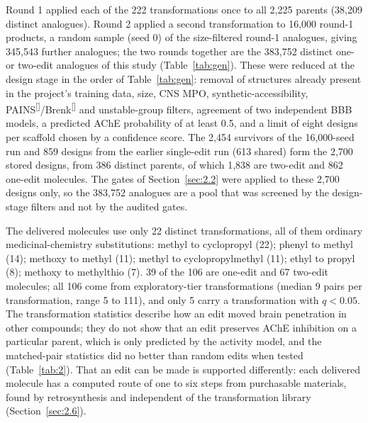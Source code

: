 \documentclass[11pt,a4paper]{article}
\renewcommand{\cite}[1]{\textsuperscript{[\citenum{#1}]}}
\begin{document}
Round 1 applied each of the 222 transformations once to all 2,225 parents (38,209 distinct analogues). Round 2 applied a second transformation to 16,000 round-1 products, a random sample (seed 0) of the size-filtered round-1 analogues, giving 345,543 further analogues; the two rounds together are the 383,752 distinct one- or two-edit analogues of this study (Table~\ref{tab:gen}). These were reduced at the design stage in the order of Table~\ref{tab:gen}: removal of structures already present in the project's training data, size, CNS MPO, synthetic-accessibility, PAINS\cite{pains}/Brenk\cite{brenk} and unstable-group filters, agreement of two independent BBB models, a predicted AChE probability of at least 0.5, and a limit of eight designs per scaffold chosen by a confidence score. The 2,454 survivors of the 16,000-seed run and 859 designs from the earlier single-edit run (613 shared) form the 2,700 stored designs, from 386 distinct parents, of which 1,838 are two-edit and 862 one-edit molecules. The gates of Section~\ref{sec:2.2} were applied to these 2,700 designs only, so the 383,752 analogues are a pool that was screened by the design-stage filters and not by the audited gates.

The delivered molecules use only 22 distinct transformations, all of them ordinary medicinal-chemistry substitutions: methyl to cyclopropyl (22); phenyl to methyl (14); methoxy to methyl (11); methyl to cyclopropylmethyl (11); ethyl to propyl (8); methoxy to methylthio (7). 39 of the 106 are one-edit and 67 two-edit molecules; all 106 come from exploratory-tier transformations (median 9 pairs per transformation, range 5 to 111), and only 5 carry a transformation with $q<0.05$. The transformation statistics describe how an edit moved brain penetration in other compounds; they do not show that an edit preserves AChE inhibition on a particular parent, which is only predicted by the activity model, and the matched-pair statistics did no better than random edits when tested (Table~\ref{tab:2}). That an edit can be made is supported differently: each delivered molecule has a computed route of one to six steps from purchasable materials, found by retrosynthesis and independent of the transformation library (Section~\ref{sec:2.6}).
\end{document}
